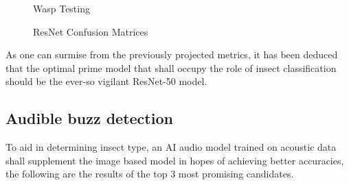 \documentclass[12pt]{article}
\begin{document}
\begin{enumerate}
\begin{figure}[H]
\begin{minipage}{0.45\textwidth}
				Wasp Testing
			\end{minipage}
			\vspace{1 cm}
			\caption{ResNet Confusion Matrices}
		\end{figure}
	\end{enumerate}
	As one can surmise from the previously projected metrics, it has been deduced that the optimal prime model that shall occupy the role of insect classification should be the ever-so vigilant ResNet-50 model.
	\subsection{Audible buzz detection}
	To aid in determining insect type, an AI audio model trained on acoustic data shall supplement the image based model in hopes of achieving better accuracies, the following are the results of the top 3 most promising candidates.
	
\end{document}
